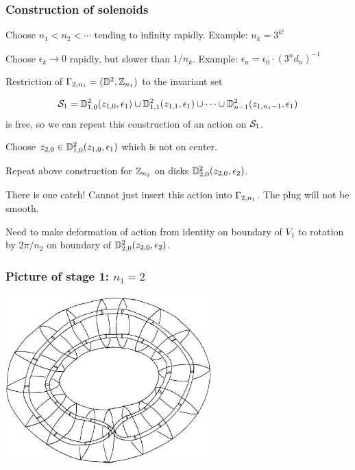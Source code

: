 \documentclass{beamer}
\begin{document}
\frame
{
  \frametitle{Construction of solenoids}

Choose   $n_1 < n_2 < \cdots $ tending to infinity   rapidly. Example: $n_k =      3^{k!}$
\medskip

Choose  $\epsilon_k \to 0$ rapidly, but slower than $1/n_k$. Example: $\epsilon_n = \epsilon_0 \cdot (3^n d_n)^{-1}$

\medskip
Restriction of  $\Gamma_{2,n_1} = ({\mathbb D}^2, {\mathbb Z}_{n_1})$ to the invariant set

$${\mathcal S}_1 = {\mathbb D}^2_{1,0} (z_{1,0},\epsilon_1) \cup  {\mathbb D}^2_{1,1} (z_{1,1},\epsilon_1) \cup \cdots \cup  {\mathbb D}^2_{n-1} (z_{1, n_1-1},\epsilon_1) $$
 is free, so we can repeat this construction of an action on ${\mathcal S}_1$. 
 
\medskip


Choose  $z_{2,0} \in {\mathbb D}^2_{1,0} (z_{1,0},\epsilon_1)$ which is not on center. 
\medskip

Repeat above construction for ${\mathbb Z}_{n_2}$ on disks ${\mathbb D}^2_{2,0} (z_{2,0},\epsilon_2)$. 
\medskip

There is one catch! Cannot just insert this action into $\Gamma_{2,n_1}$. The plug will not be smooth.

\medskip

 Need to make deformation of action from identity on boundary of $V_1$ to rotation by $2\pi/n_2$ on boundary of ${\mathbb D}^2_{2,0} (z_{2,0},\epsilon_2)$. 

  \vfill
  
}

\frame
{
  \frametitle{Picture of stage 1: $n_1 = 2$}
  
  \begin{center}
\includegraphics[width=0.6\textwidth]{pix/hirschplug.pdf}
\label{figure-originalhirsch2}
\end{center}


  \vfill
  
}
  
\end{document}
